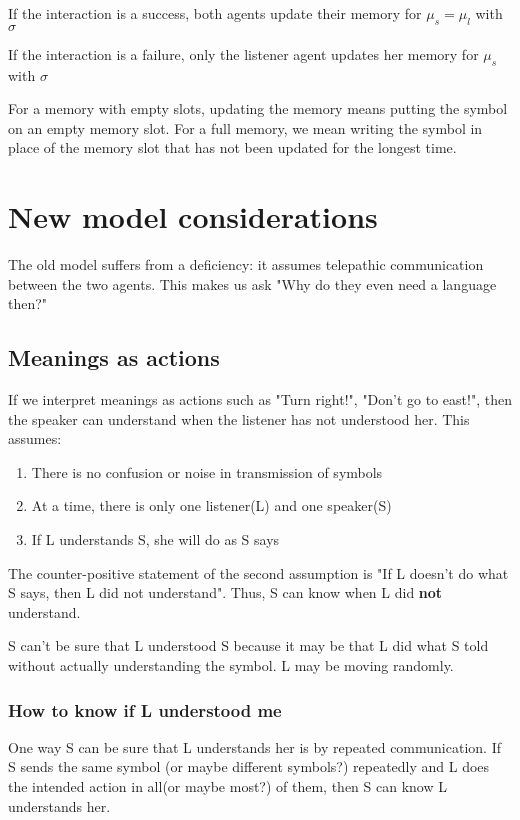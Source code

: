 \documentclass{article}
\begin{document}
If the interaction is a success, both agents update their memory for $\mu_{s}=\mu_{l}$ with $\sigma$

If the interaction is a failure, only the listener agent updates her memory for $\mu_{s}$ with $\sigma$

For a memory with empty slots, updating the memory means putting the symbol on an empty memory slot. For a full memory, we mean writing the symbol in place of the memory slot that has not been updated for the longest time. 

\section{New model considerations}

The old model suffers from a deficiency: it assumes telepathic communication between the two agents. This makes us ask "Why do they even need a language then?"

\subsection{Meanings as actions}

If we interpret meanings as actions such as "Turn right!", "Don't go to east!", then the speaker can understand when the listener has not understood her. This assumes:

\begin{enumerate}
    \item There is no confusion or noise in transmission of symbols
    \item At a time, there is only one listener(L) and one speaker(S)
    \item If L understands S, she will do as S says
\end{enumerate}

The counter-positive statement of the second assumption is "If L doesn't do what S says, then L did not understand". Thus, S can know when L did \textbf{not} understand.

S can't be sure that L understood S because it may be that L did what S told without actually understanding the symbol. L may be moving randomly.

\subsubsection{How to know if L understood me}

One way S can be sure that L understands her is by repeated communication. If S sends the same symbol (or maybe different symbols?) repeatedly and L does the intended action in all(or maybe most?) of them, then S can know L understands her.
\end{document}
